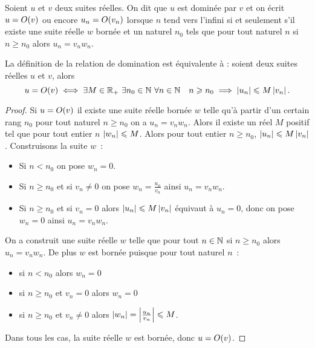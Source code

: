 \begin{defdef}
  Soient \(u\) et \(v\) deux suites réelles. On dit que \(u\) est dominée par \(v\) et on écrit \(u=O\mathopen{}\left(v\right)\) ou encore \(u_n=O\mathopen{}\left(v_n\right)\) lorsque \(n\) tend vers l'infini si et seulement s'il existe une suite réelle \(w\) bornée et un naturel \(n_0\) tels que pour tout naturel \(n\) si \(n \geqslant n_0\) alors \(u_n = v_n w_n\). 
\end{defdef}
\begin{prop}
  La définition de la relation de domination est équivalente à : soient deux suites réelles \(u\) et \(v\), alors
  \begin{equation}
    u=O\mathopen{}\left(v\right) \iff \exists M \in \mathbb{R}_{+} \ \exists n_0 \in \mathbb{N} \ \forall n \in \mathbb{N} \quad n \geqslant n_0 \implies \left\lvert u_n\right\rvert \leqslant M \left\lvert v_n\right\rvert.
  \end{equation}
\end{prop}
\begin{proof}
  Si \(u=O\mathopen{}\left(v\right)\) il existe une suite réelle bornée \(w\) telle qu'à partir d'un certain rang \(n_0\) pour tout naturel \(n\geqslant n_0\) on a \(u_n=v_n w_n\). Alors il existe un réel \(M\) positif tel que pour tout entier \(n\) \(\left\lvert w_n\right\rvert \leqslant M\). Alors pour tout entier \(n \geqslant n_0\), \(\left\lvert u_n\right\rvert\leqslant M \left\lvert v_n\right\rvert\). Construisons la suite \(w\)~:
  \begin{itemize}
      \item Si \(n < n_0\) on pose \(w_n=0\). 
      \item Si \(n \geqslant n_0\) et si \(v_n \neq 0\) on pose \(w_n = \frac{u_n}{v_n}\) ainsi \(u_n = v_n w_n\).
      \item Si \(n \geqslant n_0\) et si \(v_n = 0\) alors \(\left\lvert u_n\right\rvert \leqslant M \left\lvert v_n\right\rvert\) équivaut à \(u_n=0\), donc on pose \(w_n=0\) ainsi \(u_n=v_n w_n\).
  \end{itemize}
On a construit une suite réelle \(w\) telle que pour tout \(n \in \mathbb{N}\) si \(n \geqslant n_0\) alors \(u_n = v_n w_n\). De plus \(w\) est bornée puisque pour tout naturel \(n\)~:
\begin{itemize}
    \item si \(n < n_0\) alors \(w_n=0\) 
    \item si \(n \geqslant n_0\) et \(v_n=0\) alors \(w_n=0\) 
    \item si \(n \geqslant n_0\) et \(v_n \neq 0\) alors \(\left\lvert w_n\right\rvert=\left\lvert\frac{u_n}{v_n}\right\rvert \leqslant M\).
\end{itemize}
Dans tous les cas, la suite réelle \(w\) est bornée, donc \(u=O\mathopen{}\left(v\right)\).
\end{proof}
